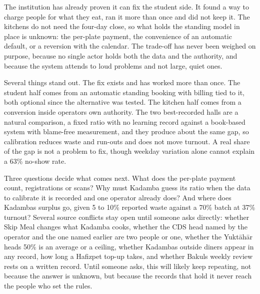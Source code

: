 \documentclass[
  10pt,
  table]{article}
\begin{document}
The institution has already proven it can fix the student side. It found a way to charge people for what they eat, ran it more than once and did not keep it. The kitchens do not need the four-day close, so what holds the standing model in place is unknown: the per-plate payment, the convenience of an automatic default, or a reversion with the calendar. The trade-off has never been weighed on purpose, because no single actor holds both the data and the authority, and because the system attends to loud problems and not large, quiet ones.

Several things stand out. The fix exists and has worked more than once. The student half comes from an automatic standing booking with billing tied to it, both optional since the alternative was tested. The kitchen half comes from a conversion inside operators\textquotesingle{} own authority. The two best-recorded halls are a natural comparison, a fixed ratio with no learning record against a book-based system with blame-free measurement, and they produce about the same gap, so calibration reduces waste and run-outs and does not move turnout. A real share of the gap is not a problem to fix, though weekday variation alone cannot explain a 63\% no-show rate.

Three questions decide what comes next. What does the per-plate payment count, registrations or scans? Why must Kadamba guess its ratio when the data to calibrate it is recorded and one operator already does? And where does Kadamba\textquotesingle s surplus go, given 5 to 10\% reported waste against a 70\% batch at 37\% turnout? Several source conflicts stay open until someone asks directly: whether Skip Meal changes what Kadamba cooks, whether the CDS head named by the operator and the one named earlier are two people or one, whether the Yuktāhār head\textquotesingle s 50\% is an average or a ceiling, whether Kadamba\textquotesingle s outside diners appear in any record, how long a Hafizpet top-up takes, and whether Bakul\textquotesingle s weekly review rests on a written record. Until someone asks, this will likely keep repeating, not because the answer is unknown, but because the records that hold it never reach the people who set the rules.
\end{document}
